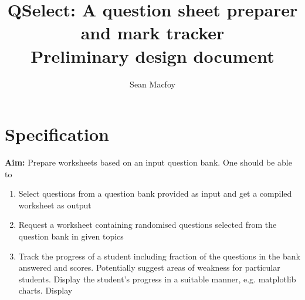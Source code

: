 \documentclass{article}
\title{
    QSelect: A question sheet preparer and mark tracker \\
    Preliminary design document
    }
\author{Sean Macfoy}
\begin{document}
\maketitle

\section{Specification}
\textbf{Aim:} Prepare worksheets based on an input question bank. One should be
able to\\

\begin{enumerate}
    \item Select questions from a question bank provided as input and get a
        compiled worksheet as output

    \item Request a worksheet containing randomised questions selected from the
        question bank in given topics

    \item Track the progress of a student including fraction of the questions
        in the bank answered and scores. Potentially suggest areas of weakness
        for particular students. Display the student's progress in a suitable
        manner, e.g. matplotlib charts. Display 
\end{enumerate}
\end{document}
